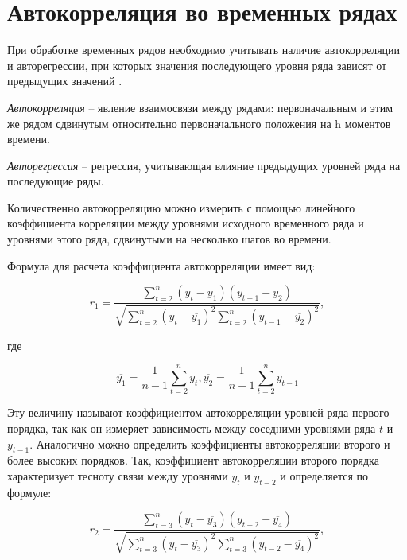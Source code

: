 \section{Автокорреляция во временных рядах}
\label{sec:autocorrelation}

При обработке временных рядов необходимо учитывать наличие автокорреляции и авторегрессии, при которых значения последующего уровня ряда зависят от предыдущих значений \cite{datamining_in_action}.

\textit{Автокорреляция} – явление взаимосвязи между рядами: первоначальным и этим же рядом сдвинутым относительно первоначального положения на h моментов времени.

\textit{Авторегрессия} – регрессия, учитывающая влияние предыдущих уровней ряда на последующие ряды.

Количественно автокорреляцию можно измерить с помощью линейного коэффициента корреляции между уровнями исходного временного ряда и уровнями этого ряда, сдвинутыми на несколько шагов во времени.

Формула для расчета коэффициента автокорреляции имеет вид:

\begin{equation}\label{autocorrelation_formula}
	r_1=\frac{\sum_{t=2}^{n}(y_t - \overline{y_1})(y_{t-1} - \overline{y_2})}{\sqrt{\sum_{t=2}^{n}(y_t - \overline{y_1})^2\sum_{t=2}^{n}(y_{t-1} - \overline{y_2})^2}},
\end{equation}

где

\begin{equation}
\overline{y_1}=\frac{1}{n-1}\sum_{t=2}^{n}y_t , \overline{y_2}=\frac{1}{n-1}\sum_{t=2}^{n}y_{t-1}
\end{equation}

Эту величину называют коэффициентом автокорреляции уровней ряда первого порядка, так как он измеряет зависимость между соседними уровнями ряда $t$ и $y_{t-1}$. Аналогично можно определить коэффициенты автокорреляции второго и более высоких порядков. Так, коэффициент автокорреляции второго порядка характеризует тесноту связи между уровнями $y_t$ и $y_{t-2}$ и определяется по формуле:

\begin{equation}\label{autocorrelation_formula}
	r_2=\frac{\sum_{t=3}^{n}(y_t - \overline{y_3})(y_{t-2} - \overline{y_4})}{\sqrt{\sum_{t=3}^{n}(y_t - \overline{y_3})^2\sum_{t=3}^{n}(y_{t-2} - \overline{y_4})^2}},
\end{equation}

